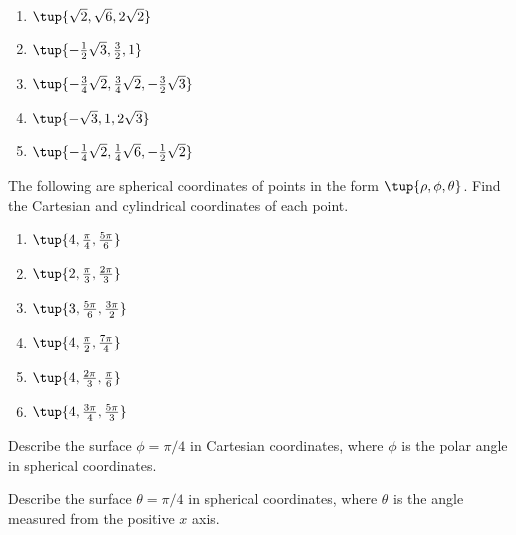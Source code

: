 \begin{enumialphparenastyle}
\begin{ex}
\begin{enumerate}
\item $\tup{\sqrt{2},\sqrt{6},2\sqrt{2}} $

\item $\tup{-\frac{1}{2}\sqrt{3},\frac{3}{2},1} $

\item $\tup{-\frac{3}{4}\sqrt{2},\frac{3}{4}\sqrt{2},-\frac{3}{2}\sqrt{3}} $

\item $\tup{-\sqrt{3},1,2\sqrt{3}} $

\item $\tup{-\frac{1}{4}\sqrt{2},\frac{1}{4}\sqrt{6},-\frac{1}{2}\sqrt{2}} $
\end{enumerate}
\end{ex}

\begin{ex}
The following are spherical coordinates of points in the form $\tup{
\rho,\phi,\theta }$. Find the Cartesian and cylindrical
coordinates of each point.

\begin{enumerate}
\item $\tup{4,\frac{\pi }{4},\frac{5\pi }{6}} $

\item $\tup{2,\frac{\pi }{3},\frac{2\pi }{3}} $

\item $\tup{3,\frac{5\pi }{6},\frac{3\pi }{2}} $

\item $\tup{4,\frac{\pi }{2},\frac{7\pi }{4}} $

\item $\tup{4,\frac{2\pi }{3},\frac{\pi }{6}} $

\item $\tup{4,\frac{3\pi }{4},\frac{5\pi }{3}} $
\end{enumerate}
\end{ex}

\begin{ex} Describe the surface $\phi =\pi
/4$ in Cartesian coordinates, where $\phi $ is the polar angle in spherical coordinates.
\end{ex}

\begin{ex} Describe the surface $\theta =\pi /4$ in spherical coordinates, where $\theta $ is
the angle measured from the positive $x$ axis. 
\end{ex}


\end{enumialphparenastyle}
